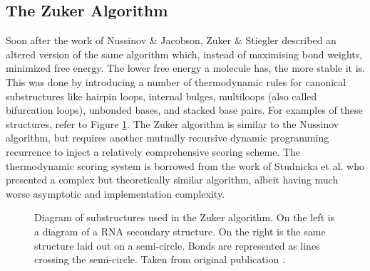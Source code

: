 \documentclass[12pt, a4paper]{article}
\begin{document}
\subsection{The Zuker Algorithm}
Soon after the work of Nussinov \& Jacobson, Zuker \& Stiegler \cite{zuker1981optimal}
described an altered version of the same algorithm which, instead of maximising
bond weights, minimized free energy. The lower free energy a molecule has, the more stable it is. This was done
by introducing a number of thermodynamic rules for canonical substructures like hairpin loops, internal bulges, multiloops (also called bifurcation loops), unbonded bases, and stacked base pairs. For examples of these structures, refer to Figure \ref{fig:zuk_struct}. The Zuker algorithm is similar to the Nussinov algorithm,
but requires another mutually recursive dynamic programming recurrence to inject a relatively comprehensive scoring scheme. The thermodynamic scoring system is borrowed from the work of Studnicka et al. \cite{studnicka1978computer} who presented a
complex but theoretically similar algorithm, albeit having
much worse asymptotic and implementation complexity. 

\begin{figure}
\begin{center}
\end{center}
\caption{Diagram of substructures used in the Zuker algorithm. On the left is a diagram of a RNA secondary structure. On the right is the same structure laid out on a semi-circle. Bonds are represented as lines crossing the semi-circle. Taken from original
publication \cite{zuker1981optimal}.}
\label{fig:zuk_struct}
\end{figure}
\end{document}
